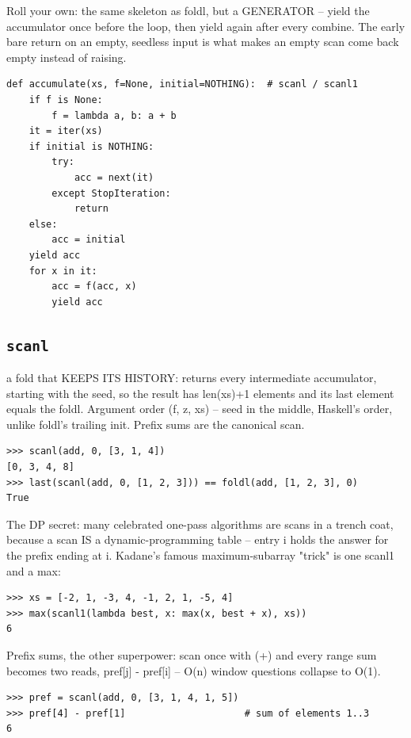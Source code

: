 \documentclass[10pt,letterpaper]{book}
\begin{document}
Roll your own: the same skeleton as foldl, but a GENERATOR -- yield the accumulator once before the loop, then yield again after every combine. The early bare return on an empty, seedless input is what makes an empty scan come back empty instead of raising.

\begin{lstlisting}[style=ex]
def accumulate(xs, f=None, initial=NOTHING):  # scanl / scanl1
    if f is None:
        f = lambda a, b: a + b
    it = iter(xs)
    if initial is NOTHING:
        try:
            acc = next(it)
        except StopIteration:
            return
    else:
        acc = initial
    yield acc
    for x in it:
        acc = f(acc, x)
        yield acc
\end{lstlisting}

\subsection{\texttt{scanl}}\label{def:scanl}
a fold that KEEPS ITS HISTORY: returns every intermediate accumulator, starting with the seed, so the result has len(xs)+1 elements and its last element equals the foldl. Argument order (f, z, xs) -- seed in the middle, Haskell's order, unlike foldl's trailing init. Prefix sums are the canonical scan.
\begin{lstlisting}[style=ex]
>>> scanl(add, 0, [3, 1, 4])
[0, 3, 4, 8]
>>> last(scanl(add, 0, [1, 2, 3])) == foldl(add, [1, 2, 3], 0)
True
\end{lstlisting}

The DP secret: many celebrated one-pass algorithms are scans in a trench coat, because a scan IS a dynamic-programming table -- entry i holds the answer for the prefix ending at i. Kadane's famous maximum-subarray "trick" is one scanl1 and a max:

\begin{lstlisting}[style=ex]
>>> xs = [-2, 1, -3, 4, -1, 2, 1, -5, 4]
>>> max(scanl1(lambda best, x: max(x, best + x), xs))
6
\end{lstlisting}

Prefix sums, the other superpower: scan once with (+) and every range sum becomes two reads, pref[j] - pref[i] -- O(n) window questions collapse to O(1).

\begin{lstlisting}[style=ex]
>>> pref = scanl(add, 0, [3, 1, 4, 1, 5])
>>> pref[4] - pref[1]                     # sum of elements 1..3
6
\end{lstlisting}
\end{document}
